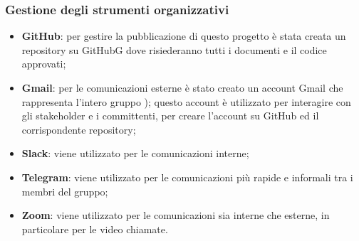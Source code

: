 \subsubsection{Gestione degli strumenti organizzativi}
\begin{itemize}
	\item \textbf{GitHub}: per gestire la pubblicazione di questo progetto è stata creata un repository su GitHubG dove risiederanno tutti i documenti e il codice approvati;
	\item \textbf{Gmail}: per le comunicazioni esterne è stato creato un account Gmail che rappresenta l’intero gruppo \Mail{}); questo account è utilizzato per interagire con gli
stakeholder e i committenti, per creare l’account su GitHub ed il corrispondente repository;
	\item \textbf{Slack}: viene utilizzato per le comunicazioni interne;
	\item \textbf{Telegram}: viene utilizzato per le comunicazioni più rapide e informali tra i membri del
gruppo;
	\item \textbf{Zoom}: viene utilizzato per le comunicazioni sia interne che esterne, in particolare per le video chiamate.
\end{itemize}
